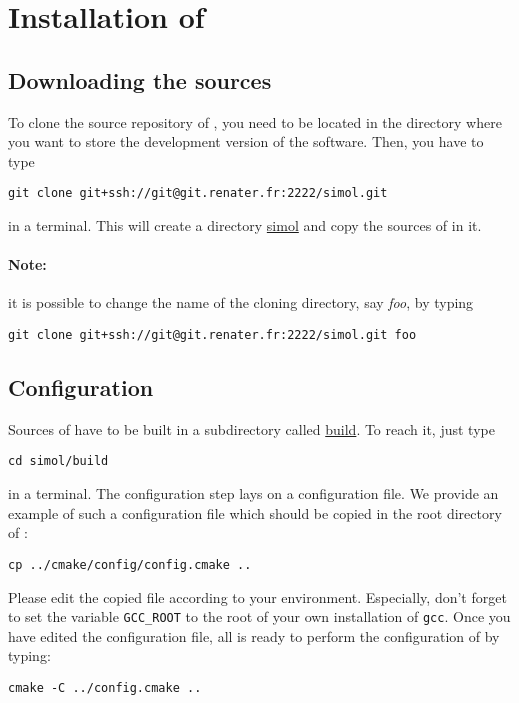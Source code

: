 \section{Installation of \Simol}

\subsection{Downloading the sources}

To clone the source repository of \Simol, you need to be located in the directory where you want to store the development version of the software. Then, you have to type
\begin{verbatim}
git clone git+ssh://git@git.renater.fr:2222/simol.git
\end{verbatim}
in a terminal. This will create a directory \url{simol} and copy the sources of \Simol in it. 

\paragraph{Note:}
it is possible to change the name of the cloning directory, say \textit{foo}, by typing 
\begin{verbatim}
git clone git+ssh://git@git.renater.fr:2222/simol.git foo
\end{verbatim}




\subsection{Configuration}

Sources of \Simol have to be built in a subdirectory called \url{build}. To reach it, just type
\begin{verbatim}
cd simol/build
\end{verbatim}
in a terminal. The configuration step lays on a configuration file. We provide an example of such a configuration file which should be copied in the root directory of \Simol :
\begin{verbatim}
cp ../cmake/config/config.cmake ..
\end{verbatim}
Please edit the copied file according to your environment. Especially, don't forget to set the variable \texttt{GCC\_ROOT} to the root of your own installation of \texttt{gcc}. Once you have edited the configuration file, all is ready to perform the configuration of \Simol by typing:
\begin{verbatim}
cmake -C ../config.cmake ..
\end{verbatim}

